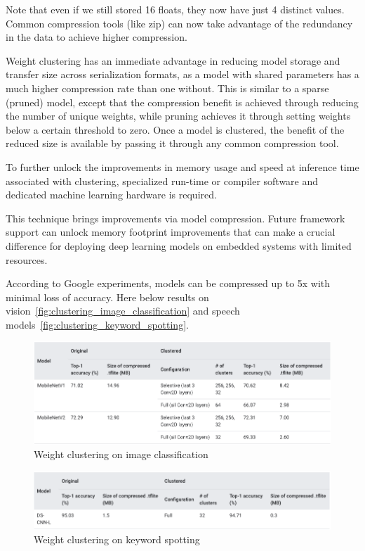Note that even if we still stored 16 floats, they now have just 4 distinct
values. Common compression tools (like zip) can now take advantage of the
redundancy in the data to achieve higher compression.

Weight clustering has an immediate advantage in reducing model storage and
transfer size across serialization formats, as a model with shared parameters
has a much higher compression rate than one without. This is similar to a
sparse (pruned) model, except that the compression benefit is achieved through
reducing the number of unique weights, while pruning achieves it through
setting weights below a certain threshold to zero. Once a model is clustered,
the benefit of the reduced size is available by passing it through any common
compression tool.

To further unlock the improvements in memory usage and speed at inference time
associated with clustering, specialized run-time or compiler software and
dedicated machine learning hardware is required.~\cite{tfmot:clustering_blog}

This technique brings improvements via model compression. Future framework
support can unlock memory footprint improvements that can make a crucial
difference for deploying deep learning models on embedded systems with limited
resources.

According to Google experiments, models can be compressed up to 5x with minimal
loss of accuracy. Here below results on
vision~\autoref{fig:clustering_image_classification} and speech
models~\autoref{fig:clustering_keyword_spotting}.

\begin{figure}[ht]
    \includegraphics[width=\textwidth]{images/introduction/clustering_image_classification.png}
    \centering
    \caption{Weight clustering on image classification}\label{fig:clustering_image_classification}
\end{figure}


\begin{figure}[ht]
    \includegraphics[width=\textwidth]{images/introduction/clustering_keyword_spotting.png}
    \centering
    \caption{Weight clustering on keyword spotting}\label{fig:clustering_keyword_spotting}
\end{figure}

